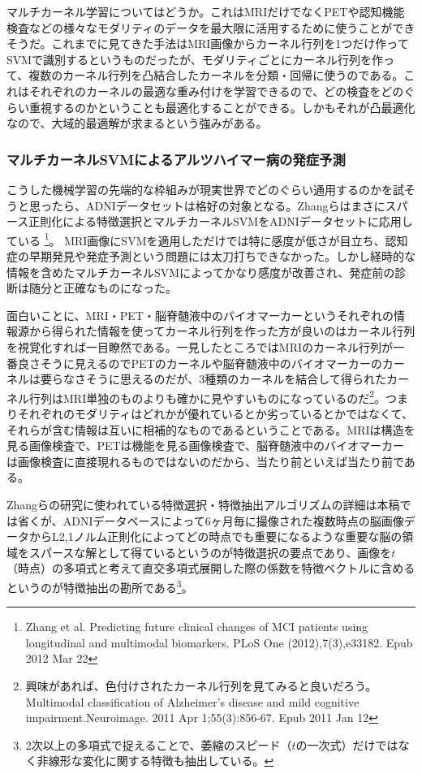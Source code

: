 マルチカーネル学習についてはどうか。これはMRIだけでなくPETや認知機能検査などの様々なモダリティのデータを最大限に活用するために使うことができそうだ。これまでに見てきた手法はMRI画像からカーネル行列を1つだけ作ってSVMで識別するというものだったが、モダリティごとにカーネル行列を作って、複数のカーネル行列を凸結合したカーネルを分類・回帰に使うのである。これはそれぞれのカーネルの最適な重み付けを学習できるので、どの検査をどのぐらい重視するのかということも最適化することができる。しかもそれが凸最適化なので、大域的最適解が求まるという強みがある。
\subsubsection{マルチカーネルSVMによるアルツハイマー病の発症予測}
こうした機械学習の先端的な枠組みが現実世界でどのぐらい通用するのかを試そうと思ったら、ADNIデータセットは格好の対象となる。Zhangらはまさにスパース正則化による特徴選択とマルチカーネルSVMをADNIデータセットに応用している
\footnote{Zhang et al. Predicting future clinical changes of MCI patients using longitudinal and multimodal biomarkers. PLoS One (2012),7(3),e33182. Epub 2012 Mar 22}。
MRI画像にSVMを適用しただけでは特に感度が低さが目立ち、認知症の早期発見や発症予測という問題には太刀打ちできなかった。しかし経時的な情報を含めたマルチカーネルSVMによってかなり感度が改善され、発症前の診断は随分と正確なものになった。

面白いことに、MRI・PET・脳脊髄液中のバイオマーカーというそれぞれの情報源から得られた情報を使ってカーネル行列を作った方が良いのはカーネル行列を視覚化すれば一目瞭然である。一見したところではMRIのカーネル行列が一番良さそうに見えるのでPETのカーネルや脳脊髄液中のバイオマーカーのカーネルは要らなさそうに思えるのだが、3種類のカーネルを結合して得られたカーネル行列はMRI単独のものよりも確かに見やすいものになっているのだ\footnote{興味があれば、色付けされたカーネル行列を見てみると良いだろう。Multimodal classification of Alzheimer's disease and mild cognitive impairment.Neuroimage. 2011 Apr 1;55(3):856-67. Epub 2011 Jan 12}。つまりそれぞれのモダリティはどれかが優れているとか劣っているとかではなくて、それらが含む情報は互いに相補的なものであるということである。MRIは構造を見る画像検査で、PETは機能を見る画像検査で、脳脊髄液中のバイオマーカーは画像検査に直接現れるものではないのだから、当たり前といえば当たり前である。

Zhangらの研究に使われている特徴選択・特徴抽出アルゴリズムの詳細は本稿では省くが、ADNIデータベースによって6ヶ月毎に撮像された複数時点の脳画像データからL2,1ノルム正則化によってどの時点でも重要になるような重要な脳の領域をスパースな解として得ているというのが特徴選択の要点であり、画像を$t$（時点）の多項式と考えて直交多項式展開した際の係数を特徴ベクトルに含めるというのが特徴抽出の勘所である\footnote{2次以上の多項式で捉えることで、萎縮のスピード（$t$の一次式）だけではなく非線形な変化に関する特徴も抽出している。}。


